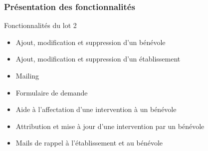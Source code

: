 \speaker{\Francois}

\begin{frame}
\frametitle{Présentation des fonctionnalités}
\begin{block}{Fonctionnalités du lot 2}
	\begin{itemize}
		\item Ajout, modification et suppression d'un bénévole
		\item Ajout, modification et suppression d'un établissement
		\item Mailing
		\item Formulaire de demande
		\item Aide à l'affectation d'une intervention à un bénévole
		\item Attribution et mise à jour d'une intervention par un bénévole
		\item Mails de rappel à l'établissement et au bénévole
	\end{itemize}
\end{block}
\end{frame}
